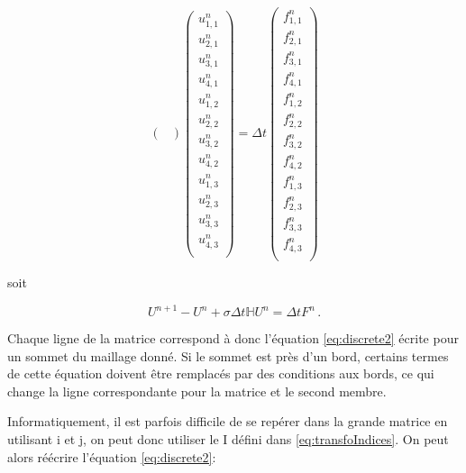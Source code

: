 \documentclass[11pt]{article}
\begin{document}
\begin{equation}
\begin{pmatrix}
\end{pmatrix}
\left(
\begin{array}{c}
u^{n}_{1,1}\\
u^{n}_{2,1}\\
u^{n}_{3,1}\\
u^{n}_{4,1}\\
u^{n}_{1,2}\\
u^{n}_{2,2}\\
u^{n}_{3,2}\\
u^{n}_{4,2}\\
u^{n}_{1,3}\\
u^{n}_{2,3}\\
u^{n}_{3,3}\\
u^{n}_{4,3}\\
\end{array}
\right)
=
\Delta t 
\left(
\begin{array}{c}
f^{n}_{1,1}\\
f^{n}_{2,1}\\
f^{n}_{3,1}\\
f^{n}_{4,1}\\
f^{n}_{1,2}\\
f^{n}_{2,2}\\
f^{n}_{3,2}\\
f^{n}_{4,2}\\
f^{n}_{1,3}\\
f^{n}_{2,3}\\
f^{n}_{3,3}\\
f^{n}_{4,3}\\
\end{array}
\right)
\label{eq:sysMat1}
\end{equation}

soit

\begin{equation}
U^{n+1} - U^{n} + \sigma\Delta t \mathbb{H} U^{n} = \Delta t F^{n} \,.
\end{equation}

Chaque ligne de la matrice correspond à donc l'équation \ref{eq:discrete2} écrite pour un sommet du maillage donné. Si le sommet est près d'un bord, certains termes de cette équation doivent être remplacés par des conditions aux bords, ce qui change la ligne correspondante pour la matrice et le second membre.

\pagebreak

Informatiquement, il est parfois difficile de se repérer dans la grande matrice en utilisant i et j, on peut donc utiliser le I défini dans \ref{eq:transfoIndices}. On peut alors réécrire l'équation \ref{eq:discrete2}:
\end{document}
